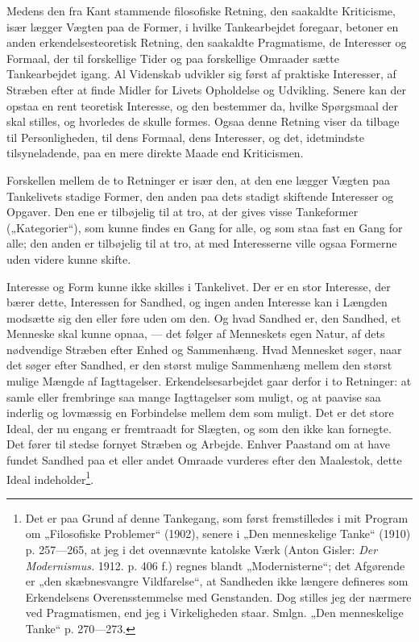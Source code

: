 \documentclass[12pt,a4paper,openany]{book}
\newcommand{\opage}[1]{\marginnote{\footnotesize\textit{[#1]}}}
\begin{document}
Medens den fra Kant stammende filosofiske Retning, den
saakaldte Kriticisme, især lægger Vægten paa de Former, i
\setcounter{footnote}{0}%
\opage{6}hvilke Tankearbejdet foregaar, betoner en anden erkendelsesteoretisk
Retning, den saakaldte Pragmatisme, de Interesser og
Formaal, der til forskellige Tider og paa forskellige Omraader
sætte Tankearbejdet igang. Al Videnskab udvikler sig først af
praktiske Interesser, af Stræben efter at finde Midler for Livets
Opholdelse og Udvikling. Senere kan der opstaa en rent teoretisk
Interesse, og den bestemmer da, hvilke Spørgsmaal der
skal stilles, og hvorledes de skulle formes. Ogsaa denne Retning
viser da tilbage til Personligheden, til dens Formaal, dens
Interesser, og det, idetmindste tilsyneladende, paa en mere direkte
Maade end Kriticismen.

Forskellen mellem de to Retninger er især den, at den
ene lægger Vægten paa Tankelivets stadige Former, den anden
paa dets stadigt skiftende Interesser og Opgaver. Den ene er
tilbøjelig til at tro, at der gives visse Tankeformer („Kategorier“),
som kunne findes en Gang for alle, og som staa fast en
Gang for alle; den anden er tilbøjelig til at tro, at med Interesserne
ville ogsaa Formerne uden videre kunne skifte.

Interesse og Form kunne ikke skilles i Tankelivet. Der
er en stor Interesse, der bærer dette, Interessen for Sandhed,
og ingen anden Interesse kan i Længden modsætte sig den
eller føre uden om den. Og hvad Sandhed er, den Sandhed,
et Menneske skal kunne opnaa, --- det følger af Menneskets
egen Natur, af dets nødvendige Stræben efter Enhed og Sammenhæng.
Hvad Mennesket søger, naar det søger efter Sandhed,
er den størst mulige Sammenhæng mellem den størst mulige
Mængde af Iagttagelser. Erkendelsesarbejdet gaar derfor i
to Retninger: at samle eller frembringe saa mange Iagttagelser
som muligt, og at paavise saa inderlig og lovmæssig en Forbindelse
mellem dem som muligt. Det er det store Ideal, der
nu engang er fremtraadt for Slægten, og som den ikke kan
fornegte. Det fører til stedse fornyet Stræben og Arbejde. Enhver
Paastand om at have fundet Sandhed paa et eller andet
Omraade vurderes efter den Maalestok, dette Ideal indeholder\footnote[1]{Det er paa Grund af denne Tankegang, som først fremstilledes i mit Program om „Filosofiske Problemer“ (1902), senere i „Den menneskelige Tanke“ (1910) p. 257---265, at jeg i det ovennævnte katolske Værk (Anton Gisler: \textit{Der Modernismus.} 1912. p. 406 f.) regnes blandt „Modernisterne“; det Afgørende er „den skæbnesvangre Vildfarelse“, at Sandheden ikke længere defineres som Erkendelsens Overensstemmelse med Genstanden. Dog stilles jeg der nærmere ved Pragmatismen, end jeg i Virkeligheden staar. Smlgn. „Den menneskelige Tanke“ p. 270---273.}.
\end{document}
